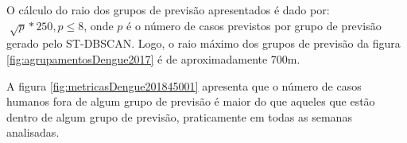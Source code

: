 \begin{figure}[!ht]
	\centering
\end{figure}
\FloatBarrier

O cálculo do raio dos grupos de previsão apresentados é dado por:
${\sqrt[]{p} * 250, p \leqslant 8}$, onde ${p}$ é o número de casos previstos por grupo de previsão gerado pelo \acrshort{ST-DBSCAN}. Logo, o raio máximo dos grupos de previsão da figura \ref{fig:agrupamentosDengue2017} é de aproximadamente 700m.

A figura \ref{fig:metricasDengue201845001} apresenta que o número de casos humanos fora de algum grupo de previsão é maior do que aqueles que estão dentro de algum grupo de previsão, praticamente em todas as semanas analisadas.
\begin{figure}[!ht]
	\centering	
\end{figure}
\FloatBarrier

